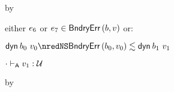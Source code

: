 {\begin{lamportproof*}
\begin{pfproof}
\begin{pfproof}
{          \)}
            \begin{pfproof}
              by 
            \end{pfproof}
          \qedstep
            \begin{pfproof}
              either $\sexpr_6$ or $\sexpr_7 \in \boundaryerror{\sbnd}{\svalue}$ or:
              \begin{mathpar}
              \end{mathpar}
            \end{pfproof}
        \end{pfproof}
        \begin{pfproof}
          \qedstep
            \begin{pfproof}
              $\edynb{\sbnd_0}{\svalue_0} \nredNS \rexpr{\boundaryerror{\sbnd_0}{\svalue_0}}{\edynb{\sbnd_1}{\svalue_1}}$
            \end{pfproof}
        \end{pfproof}
    \end{pfproof}

    \begin{pfproof}
      \absurdstep
        \begin{pfproof}
          $\snil \sWTA \svalue_1 : \tdyn$
        \end{pfproof}
    \end{pfproof}

    \begin{pfproof}
      \absurdstep
        \begin{pfproof}
          by 
        \end{pfproof}
    \end{pfproof}


\end{lamportproof*}}
